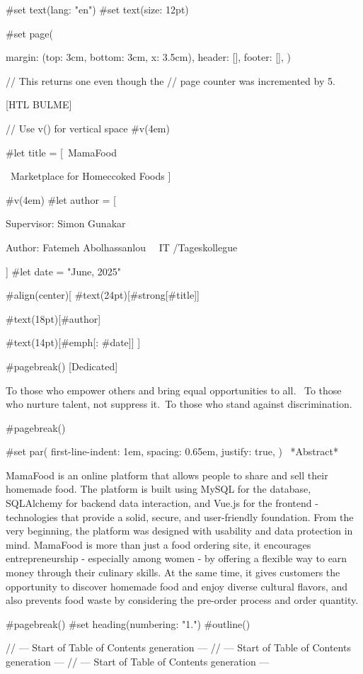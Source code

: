 #set text(lang: "en")
#set text(size: 12pt)


#set page(
  
  margin: (top: 3cm, bottom: 3cm, x: 3.5cm),
  header: [],
  footer: [],
)

// This returns one even though the
// page counter was incremented by 5.



[HTL BULME]

// Use v() for vertical space
#v(4em)

#let title = [\ MamaFood

\ Marketplace for Homeccoked Foods ]

#v(4em)
#let author = [\

  Supervisor: Simon Gunakar \
  
  Author: Fatemeh Abolhassanlou \
\
IT /Tageskollegue

]
 #let date = "June, 2025"

#align(center)[
  #text(24pt)[#strong[#title]]
  \

  #text(18pt)[#author]
  \

  #text(14pt)[#emph[\Date: #date]]
]


#pagebreak()
[Dedicated]

To those who empower others and bring equal opportunities to all. \ 
To those who nurture talent, not suppress it.\  
To those who stand against discrimination.


#pagebreak()

#set par(
  first-line-indent: 1em,
  spacing: 0.65em,
  justify: true,
)
\
*Abstract*

MamaFood is an online platform that allows people to share and sell their homemade food. The platform is built using MySQL for the database, SQLAlchemy for backend data interaction, and Vue.js for the frontend - technologies that provide a solid, secure, and user-friendly foundation. From the very beginning, the platform was designed with usability and data protection in mind. MamaFood is more than just a food ordering site, it encourages entrepreneurship - especially among women - by offering a flexible way to earn money through their culinary skills. At the same time, it gives customers the opportunity to discover homemade food and enjoy diverse cultural flavors, and also prevents food waste by considering the pre-order process and order quantity.

#pagebreak()
#set heading(numbering: "1.")
#outline()


// --- Start of Table of Contents generation ---
// --- Start of Table of Contents generation ---
// --- Start of Table of Contents generation ---

